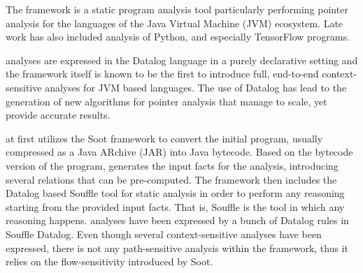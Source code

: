 The \doop{} framework is a static program analysis tool particularly performing
pointer analysis for the languages of the Java Virtual Machine (JVM) ecosystem.
Late work has also included analysis of Python, and especially TensorFlow programs.

\doop{} analyses are expressed in the Datalog language in a purely declarative
setting and the framework itself is known to be the first to introduce full,
end-to-end context-sensitive analyses for JVM based languages. The use of
Datalog has lead to the generation of new algorithms for pointer analysis
that manage to scale, yet provide accurate results.

\doop{} at first utilizes the Soot framework to convert the initial
program, usually compressed as a Java ARchive (JAR) into Java bytecode.
Based on the bytecode version of the program, \doop{} generates the input
facts for the analysis, introducing several relations that can be pre-computed.
The framework then includes the Datalog based Souffle tool for
static analysis\cite{jordan2016souffle} in order to perform any reasoning starting from
the provided input facts. That is, Souffle is the tool in which any reasoning happens.
\doop{} analyses have been expressed by a bunch of Datalog rules in Souffle Datalog.
Even though several context-sensitive analyses have been expressed, there is not any
path-sensitive analysis within the framework, thus it relies on the flow-sensitivity
introduced by Soot.
